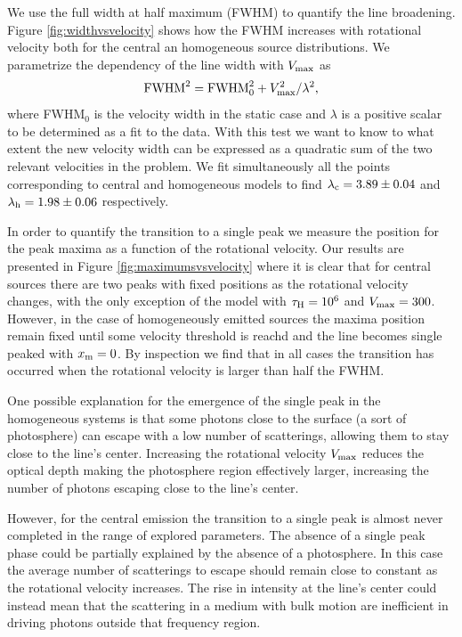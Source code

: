 \documentclass{emulateapj}
\newcommand{\kms}{{\ifmmode{{\mathrm{\,km\ s}^{-1}}}\else{\,km~s$^{-1}$}\fi}}
\begin{document}
We use the full width at half maximum (FWHM) to quantify the line
broadening. Figure \ref{fig:widthvsvelocity} shows how the FWHM increases
with rotational velocity both for the central an homogeneous source
distributions.  We parametrize the dependency of the line width with
$V_{\rm max}$ as
\begin{equation}
 {\rm FWHM}^2 = {\rm FWHM}_{0}^2 + V_{\rm max}^2/\lambda^2,
\label{eq:fwhm}
\end{equation}
%
where FWHM$_{0}$ is the
velocity width in the static case and $\lambda$ is a positive scalar
to be determined as a fit to the data. With this test we want to know
to what extent the new velocity width can be expressed as a quadratic
sum of the two relevant velocities in the problem. We fit
simultaneously all the points corresponding to central and homogeneous
models to find $\lambda_{\rm c} = 3.89 \pm 0.04$ and $\lambda_{\rm h}=
1.98\pm 0.06$ respectively. 

In order to quantify the transition to a single peak we measure the
position for the peak maxima as a function of the rotational
velocity. Our results are presented in Figure
\ref{fig:maximumsvsvelocity} where it is clear that for central
sources there are two peaks with fixed positions as the rotational
velocity changes, with the only exception of the model with $\tau_{\rm
  H}=10^6$ and $V_{\rm max}=300$\kms. However, in the case of
homogeneously emitted sources the maxima position remain fixed until
some velocity threshold is reachd and the line becomes single peaked
with $x_{\rm m}=0$. By inspection we find that in all cases the
transition has occurred when the rotational velocity is larger than
half the FWHM. 

One possible explanation for the emergence of the single peak in the
homogeneous systems is that some photons close to the surface
(a sort of photosphere) can escape with a low number of scatterings,
allowing them to stay close to the line's center. Increasing the
rotational velocity $V_{\rm max}$ reduces the optical depth making the
photosphere region effectively larger, increasing the number of
photons escaping close to the line's center. 

However, for the central emission the transition to a single peak is
almost never completed in the range of explored parameters. The absence
of a single peak phase could be partially explained by the absence of a
photosphere. In this case the average number of scatterings to escape
should remain close to constant as the rotational velocity
increases. The rise in intensity at the line's center could instead
mean that the scattering in a medium with bulk motion are inefficient
in driving photons outside that frequency region.
\end{document}
